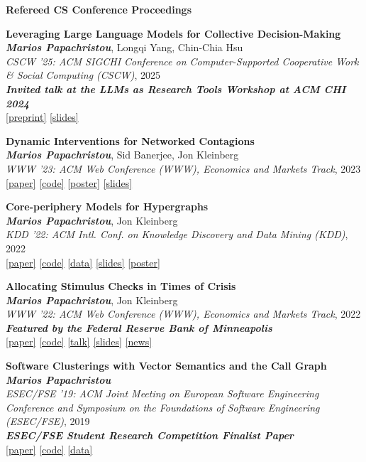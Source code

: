 \documentclass[margin]{res}
\newcommand{\field}[2]{\noindent \textbf{#1} \hfill #2 \\}
\newcommand{\specialurl}[2]{\href {#2} {{{[#1]}}}}
\newcommand{\preprint}[1]{\specialurl {preprint} {#1}}
\newcommand{\code}[1]{\specialurl {code} {#1}}
\newcommand{\data}[1]{\specialurl {data} {#1}}
\newcommand{\talk}[1]{\specialurl {talk} {#1}}
\newcommand{\slides}[1]{\specialurl {slides} {#1}}
\newcommand{\poster}[1]{\specialurl {poster} {#1}}
\newcommand{\paper}[1]{\specialurl {paper} {#1}}
\newcommand{\authorref}[1]{{\textit{\textbf{#1}}}}
\newcommand{\news}[1]{\specialurl {news} {#1}}
\newcommand{\authorme}{\authorref{Marios Papachristou}}
\newcommand{\bemph}[1]{\textbf{\emph{#1}}}
\newcommand{\publication}[5]{\textbf{#1}\\{#2}\\\emph{#3}, {#4}\\{#5}\smallskip}
\begin{document}
\begin{resume}
{\begin{enumerate}[nosep, label={[J\arabic*]}]
\end{enumerate}}

\field{Refereed CS Conference Proceedings}{}{
\begin{enumerate}[nosep, label={[C\arabic*]}]


   \item \publication{Leveraging Large Language Models for Collective Decision-Making}{\authorme, Longqi Yang, Chin-Chia Hsu}{CSCW '25: ACM SIGCHI Conference on Computer-Supported Cooperative Work \& Social Computing (CSCW)}{2025}{\textbf{\emph{Invited talk at the LLMs as Research Tools Workshop at ACM CHI 2024}} \\ \preprint{https://arxiv.org/abs/2311.04928} \slides{https://docs.google.com/presentation/d/13IsUt68rFoKdtq8wquL9fxVFHwH0hgvN/edit?usp=drive_link&ouid=109899272296285628946&rtpof=true&sd=true}}
 
   \item \publication{Dynamic Interventions for Networked Contagions}{\authorme, Sid Banerjee, Jon Kleinberg}{WWW '23: ACM Web Conference (WWW), Economics and Markets Track}{2023}{\paper{https://dl.acm.org/doi/abs/10.1145/3543507.3583470} \code{https://github.com/papachristoumarios/dynamic-clearing} \poster{https://drive.google.com/file/d/1l0TCsoZNo3NoOOHsPSh1ofctXD4ivFir/view?usp=sharing}
		\slides{https://drive.google.com/file/d/1ZZ6F6PFNsBjYKFyurkwM2IbenuzXJEAs/view?usp=share_link}}

   \item \publication{Core-periphery Models for Hypergraphs}{\authorme, Jon Kleinberg}{KDD '22: ACM Intl. Conf. on Knowledge Discovery and Data Mining (KDD)}{2022}{\paper{https://arxiv.org/abs/2206.00783} \code{https://doi.org/10.5281/zenodo.5965849} \data{https://doi.org/10.5281/zenodo.5943043} \slides{https://drive.google.com/file/d/1k9pjPaeDtg7jhUivjlEmyunimcUb-DxL/view?usp=sharing} \poster{https://drive.google.com/file/d/1RJ3C7KKhTemfj5OBAiEXUHMVp-TJhTDs/view?usp=sharing}}
   \item \publication{Allocating Stimulus Checks in Times of Crisis}{\authorme, Jon Kleinberg}{WWW '22: ACM Web Conference (WWW), Economics and Markets Track}{2022}{\bemph{Featured by the Federal Reserve Bank of Minneapolis} \\ \paper{https://doi.org/10.1145/3485447.3512047} \code{https://github.com/papachristoumarios/financial-contagion}  \talk{https://youtu.be/WUmPBztK8Mo} \slides{https://drive.google.com/file/d/1v4v4jPOTzFtP8a5dhAFLoIjZSRDxAjBz/view?usp=sharing} \news{https://www.minneapolisfed.org/article/2022/social-policy-in-the-age-of-algorithms-an-interview-with-jon-kleinberg}}   
      \item \publication{Software Clusterings with Vector Semantics and the Call Graph}{\authorme}{ESEC/FSE '19: ACM Joint Meeting on European Software Engineering Conference and Symposium on the Foundations of Software Engineering (ESEC/FSE)}{2019}{\textbf{\emph{ESEC/FSE Student Research Competition Finalist Paper}} \\\paper{https://dl.acm.org/citation.cfm?id=3342483} \code{https://github.com/papachristoumarios/sade} \data{http://doi.org/10.5281/zenodo.2652487}}
    

\end{enumerate}}
\end{resume}
\end{document}
